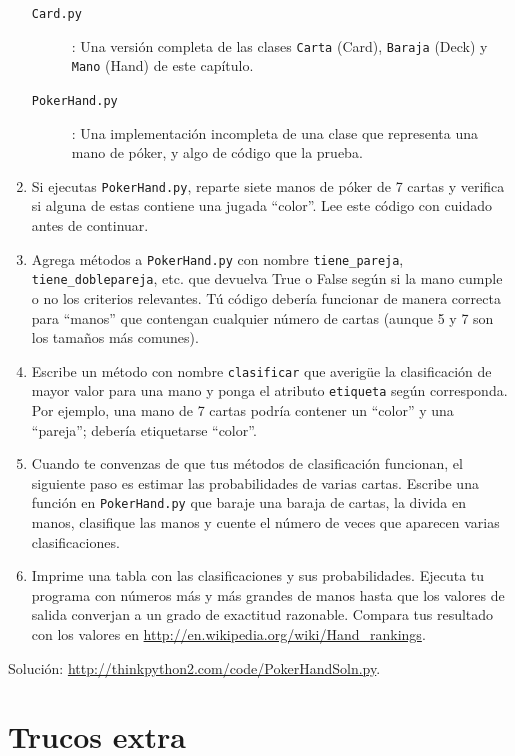 \documentclass[10pt]{book}
\begin{document}
\begin{exercise}
\begin{enumerate}
\begin{description}
\item[{\tt Card.py}]: Una versión completa de las clases {\tt Carta} (Card),
{\tt Baraja} (Deck) y {\tt Mano} (Hand) de este capítulo.

\item[{\tt PokerHand.py}]: Una implementación incompleta de una clase
que representa una mano de póker, y algo de código que la prueba.

\end{description}
%
\item Si ejecutas {\tt PokerHand.py}, reparte siete manos de póker de 7 cartas
y verifica si alguna de estas contiene una jugada ``color''.  Lee este
código con cuidado antes de continuar.

\item Agrega métodos a {\tt PokerHand.py} con nombre \verb"tiene_pareja",
\verb"tiene_doblepareja", etc. que devuelva True o False según si
la mano cumple o no los criterios relevantes.  Tú código debería
funcionar de manera correcta para ``manos'' que contengan cualquier número de cartas
(aunque 5 y 7 son los tamaños más comunes).

\item Escribe un método con nombre {\tt clasificar} que averigüe
la clasificación de mayor valor para una mano y ponga el atributo
{\tt etiqueta} según corresponda.  Por ejemplo, una mano de 7 cartas
podría contener un ``color'' y una ``pareja''; debería etiquetarse ``color''.

\item Cuando te convenzas de que tus métodos de clasificación
funcionan, el siguiente paso es estimar las probabilidades de varias
cartas.  Escribe una función en {\tt PokerHand.py} que baraje una baraja de
cartas, la divida en manos, clasifique las manos y cuente el
número de veces que aparecen varias clasificaciones.

\item Imprime una tabla con las clasificaciones y sus probabilidades.
Ejecuta tu programa con números más y más grandes de manos hasta que los
valores de salida converjan a un grado de exactitud razonable.  Compara
tus resultado con los valores en \url{http://en.wikipedia.org/wiki/Hand_rankings}.

\end{enumerate}

Solución: \url{http://thinkpython2.com/code/PokerHandSoln.py}.
\end{exercise}


\chapter{Trucos extra}
\end{document}
